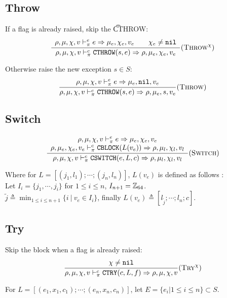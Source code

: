 \subsection{Throw}
If a flag is already raised, skip the \t{CTHROW}:
\[\dfrac{\begin{array}{c}
    \rho,\mu,\chi,v \vdash_\pi^e e \Rightarrow \mu_e,\chi_e,v_e \qquad \chi_e\ne\texttt{nil}
\end{array}}{\rho,\mu,\chi,v \vdash_\pi^c \texttt{CTHROW}(s,e) \Rightarrow \rho,\mu_e,\chi_e,v_e} (\textsc{Throw}^\chi)\]

Otherwise raise the new exception \(s\in S\):
\[\dfrac{\begin{array}{c}
    \rho,\mu,\chi,v \vdash_\pi^e e \Rightarrow \mu_e,\texttt{nil},v_e
\end{array}}{\rho,\mu,\chi,v \vdash_\pi^c \texttt{CTHROW}(s,e) \Rightarrow \rho,\mu_e,s,v_e} (\textsc{Throw})\]

\subsection{Switch}

\[\dfrac{\begin{array}{c}
    \rho,\mu,\chi,v \vdash_\pi^e e \Rightarrow \mu_e,\chi_e,v_e \\
    \rho,\mu_e,\chi_e,v_e \vdash_\pi^c \texttt{CBLOCK}(L(v_e)) \Rightarrow \rho,\mu_l,\chi_l,v_l
\end{array}}{\rho,\mu,\chi,v \vdash_\pi^c \texttt{CSWITCH}(e, L, c) \Rightarrow \rho,\mu_l,\chi_l,v_l} (\textsc{Switch})\]

Where for \(L = [(j_1, l_1); \cdots; (j_n,l_n)]\), \(L(v_e)\) is defined as follows : \\
Let \(I_i =  \{ j_1, \cdots, j_i \}\) for \(1 \leq i \leq n\), \(I_{n+1} = \mathbb{Z}_{64}\). \\
\(\tilde{j} \triangleq \min_{1\leq i \leq n+1} \{ i\ |\ v_e\in I_i \}\), finally \(L(v_e) \triangleq [l_{\tilde{j}}; \cdots; l_n; c]\).

\subsection{Try}

Skip the block when a flag is already raised:
\[\dfrac{\begin{array}{c}
    \chi\ne\texttt{nil}
\end{array}}{\rho,\mu,\chi,v \vdash_\pi^c \texttt{CTRY}(c, L, f) \Rightarrow \rho,\mu,\chi,v} (\textsc{Try}^\chi)\]

For \(L = [(e_1, x_1, c_1); \cdots; (e_n, x_n, c_n)]\), let \(E = \{ e_i | 1 \leq i \leq n \} \subset S\).

